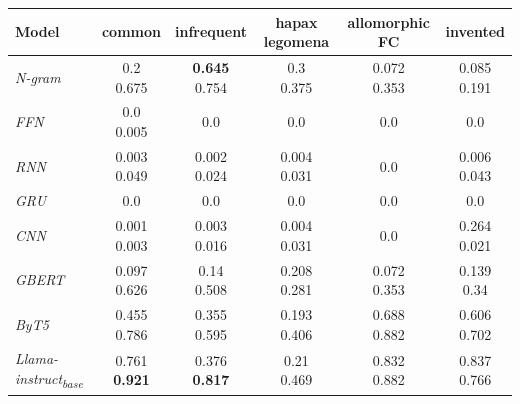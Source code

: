 \documentclass[11pt]{article}
\begin{document}
\begin{table}[htb!]
    \centering
    \renewcommand{\arraystretch}{1.02}
    \begin{tabular}{@{}lccccc@{}}
        \toprule
        Model & common & infrequent & hapax legomena & allomorphic FC & invented \\ \midrule
        \textit{N-gram} & \makecell{0.2 \\ 0.675} & \makecell{\textbf{0.645} \\ 0.754} & \makecell{0.3 \\ 0.375} & \makecell{0.072 \\ 0.353} & \makecell{0.085 \\ 0.191} \\ \cmidrule{1-6}
        \textit{FFN} & \makecell{0.0 \\ 0.005} & 0.0 & 0.0 & 0.0 & 0.0 & \\
        \textit{RNN} & \makecell{0.003 \\ 0.049} & \makecell{0.002 \\ 0.024} & \makecell{0.004 \\ 0.031} & 0.0 & \makecell{0.006 \\ 0.043} & \\
        \textit{GRU} & 0.0 & 0.0 & 0.0 & 0.0 & 0.0 & \\
        \textit{CNN} & \makecell{0.001 \\ 0.003} & \makecell{0.003 \\ 0.016} & \makecell{0.004 \\ 0.031} & 0.0 & \makecell{0.264 \\ 0.021} \\ \cmidrule{1-6}
        \textit{GBERT} & \makecell{0.097 \\ 0.626} & \makecell{0.14 \\ 0.508} & \makecell{0.208 \\ 0.281} & \makecell{0.072 \\ 0.353} & \makecell{0.139 \\ 0.34} & \\
        \textit{ByT5} & \makecell{0.455 \\ 0.786} & \makecell{0.355 \\ 0.595} & \makecell{0.193 \\ 0.406} & \makecell{0.688 \\ 0.882} & \makecell{0.606 \\ 0.702} \\ \midrule
        \textit{Llama-instruct\textsubscript{base}} & \makecell{0.761 \\ \textbf{0.921}} & \makecell{0.376 \\ \textbf{0.817}} & \makecell{0.21 \\ 0.469} & \makecell{0.832 \\ 0.882} & \makecell{0.837 \\ 0.766} & \\

\end{tabular}
\end{table}
\end{document}
